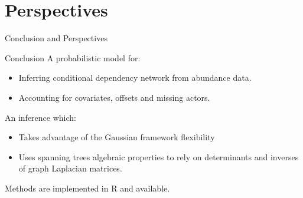 \documentclass[11pt]{beamer}
\newcommand{\bleu}[1]{\textcolor{Framableulight}{#1}}
\begin{document}
 
\section{Perspectives}
\begin{frame}{}
\begin{center}
\Huge{\bleu{Conclusion and Perspectives}}
\end{center}
\begin{center}
\end{center}
\end{frame}

 \begin{frame}{Conclusion}
 A probabilistic model for:\\
 
 
 \begin{itemize}
 \item Inferring conditional dependency network from abundance data.
 \item Accounting for covariates, offsets and missing actors.
  \end{itemize}
  \bigskip
  
  An inference which:\\
  
 \begin{itemize}
   \item Takes advantage of the Gaussian framework flexibility
 \item Uses spanning trees algebraic properties to rely on determinants and inverses of graph Laplacian matrices.
 \end{itemize}
  \bigskip
  
 Methods are implemented in R and available.
 \end{frame}
 
\end{document}
